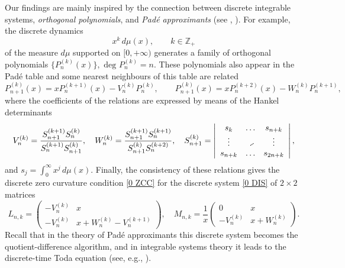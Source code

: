 \documentclass{amsart}
\theoremstyle{remark}
\numberwithin{equation}{section}
\begin{document}
Our findings are mainly inspired by the connection between discrete integrable systems, \textit{orthogonal polynomials}, 
and \textit{Pad\'e approximants}
(see \cite{PGR1995}, \cite{SNderK2011}). For example, the discrete dynamics
\begin{equation}\label{0 DTT}
x^k\, d\mu(x), \qquad k\in{{\mathbb Z}}_+
\end{equation}
of the measure $d\mu$ supported on $[0,+\infty)$ generates a family of orthogonal polynomials $\{P_n^{(k)}(x)\}, \,\, \mbox{deg }P_n^{(k)}=n$. These polynomials also appear in the Pad\'e table and some nearest neighbours of this table are related
$$
P_{n+1}^{(k)}(x)  =  xP_{n}^{(k+1)}(x)-V_{n}^{(k)}P_{n}^{(k)},  \qquad
P_{n+1}^{(k)}(x)  =  xP_{n}^{(k+2)}(x)-W_{n}^{(k)}P_{n}^{(k+1)},
$$
where the coefficients of the relations are expressed by means of the Hankel determinants
\begin{equation*}
V_{n}^{(k)}  =  \frac{S_{n+1}^{(k+1)}S_{n}^{(k)}}{S_{n}^{(k+1)}S_{n+1}^{(k)}} ,\quad
W_{n}^{(k)}  =  \frac{S_{n+1}^{(k+1)}S_{n}^{(k+1)}}{S_{n+1}^{(k)}S_{n}^{(k+2)}} ,\quad
S_{n+1}^{(k)}=
\left|\begin{array}{cccc}
s_{k}           & \ldots      &  s_{n+k}  \\
\vdots          & {\begin{picture}(2,2)
\multiput(0,0)(1.5,1){3}{.}\end{picture}}            &  \vdots  \\
s_{n+k}      & \ldots     &  s_{2n+k}
\end{array}\right|,
\end{equation*}
and $s_j=\int_{0}^{\infty}x^j\, d\mu(x)$.
Finally, the consistency of these relations gives the discrete zero curvature condition \eqref{0 ZCC} for the discrete system \eqref{0 DIS} of $2 \times 2$ matrices
\begin{equation*}
L_{n,k}=\left( \begin{array}{cc}
-V_{n}^{(k)} & x \\
-V_{n}^{(k)} & x + W_{n}^{(k)} -V_{n}^{(k+1)}
\end{array} \right), \quad
M_{n,k}=\frac{1}{x}\left( \begin{array}{cc}
0 & x \\
- V_{n}^{(k)} & x+ W_{n}^{(k)}
\end{array} \right).
\end{equation*}
Recall that in the theory of Pad\'e approximants this discrete system becomes
 the quotient-difference algorithm, and in integrable systems theory it leads to the discrete-time Toda equation
(see, e.g., \cite{Suris}).
\end{document}
